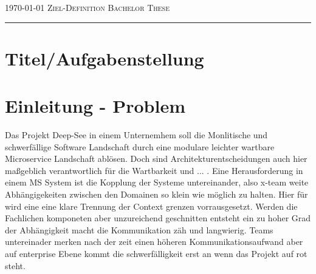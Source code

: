 \documentclass[12pt]{amsart}
\begin{document}
\thispagestyle{empty}

{\scshape \today} \hfill {\scshape \large Ziel-Definition} \hfill {\scshape Bachelor These}
 
\smallskip

\hrule

\bigskip

\section*{{\bf Titel/Aufgabenstellung}}

\bigskip



\bigskip
\section*{{\bf Einleitung - Problem}}
Das Projekt Deep-See in einem Unternemhem soll die Monlitische und schwerfällige Software Landschaft durch eine modulare leichter wartbare Microservice Landschaft ablösen. Doch sind Architekturentscheidungen auch hier maßgeblich verantwortlich für die Wartbarkeit und ... .
Eine Herausforderung in einem MS System ist die Kopplung der Systeme untereinander, also x-team weite Abhängigekeiten zwischen den Domainen so klein wie möglich zu halten. Hier für wird eine eine klare Trennung der Context grenzen vorrausgesetzt. Werden die Fachlichen komponeten aber unzureichend geschnitten entsteht ein zu hoher Grad der Abhängigkeit macht die Kommunikation zäh und langwierig. Teams untereinader merken nach der zeit einen höheren Kommunikationsaufwand aber auf enterprise Ebene kommt die schwerfälligkeit erst an wenn das Projekt auf rot steht. 
\end{document}
